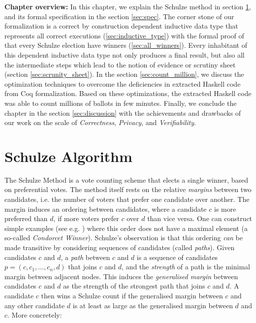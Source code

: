  
 
 \textbf{Chapter overview:} In this chapter, we explain the Schulze method in section \ref{sec:schulze_algorithm}, 
 and its formal specification in the section \ref{sec:spec}. The  corner stone of our formalization is 
 a correct by construction dependent inductive data type 
 that represents all correct executions (\ref{sec:inductive_type}) with the formal proof of
 that every Schulze election have winners (\ref{sec:all_winners}).  Every inhabitant of 
 this dependent inductive data type not only produces a final result, but also all the 
 intermediate steps which lead to the notion of evidence or scrutiny sheet (section 
  \ref{sec:scrunity_sheet}).  In the section \ref{sec:count_million}, we discuss the optimization techniques
   to overcome the deficiencies in extracted Haskell code from Coq formalization. Based on 
   these optimizations, the extracted Haskell code was able to count millions of ballots in few 
   minutes. 
   Finally, we conclude the chapter in the section \ref{sec:discussion} with 
   the achievements and drawbacks of our work on the scale of \textit{Correctness},
   \textit{Privacy}, and \textit{Verifiability}.
 



\section{Schulze Algorithm}
\label{sec:schulze_algorithm}
The Schulze Method \citep{Schulze:2011:NMC} is a vote counting scheme
that elects a single winner, based on preferential votes. 
The method itself rests on the relative 
\emph{margins} between two candidates, i.e. the number of
voters that prefer one candidate over another.  The margin induces
an ordering between candidates, where a candidate $c$ is more
preferred than $d$, if more voters prefer $c$ over $d$ than 
vice versa. One can construct simple examples (see e.g.
\citep{Rivest:2010:OSW}) where this order does not have a maximal
element (a so-called \emph{Condorcet Winner}). Schulze's observation
is that this ordering \emph{can} be made transitive by considering
sequences of candidates (called \emph{paths}). Given candidates $c$
and $d$, a \emph{path} between $c$ and $d$ is a sequence of candidates
 $p = (c, c_1,\dots, c_n, d)$ that joins $c$ and $d$, and 
 the \emph{strength} of a
path is the minimal margin between adjacent nodes. This induces the
\emph{generalised margin} between candidates $c$ and $d$ as the
strength of the strongest path that joins $c$ and $d$. A candidate
$c$ then wins a Schulze count if the generalised margin between $c$
and any other candidate $d$ is at least as large as the generalised
margin between $d$ and $c$. More concretely:

